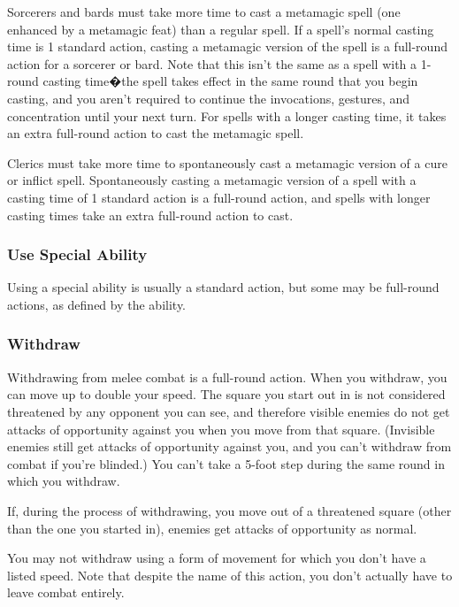 \vspace*{10pt}

Sorcerers and bards must take more time to cast a metamagic spell (one enhanced by a metamagic feat) than a regular spell. If a spell's normal casting time is 1 standard action, casting a metamagic version of the spell is a full-round action for a sorcerer or bard. Note that this isn't the same as a spell with a 1-round casting time�the spell takes effect in the same round that you begin casting, and you aren't required to continue the invocations, gestures, and concentration until your next turn. For spells with a longer casting time, it takes an extra full-round action to cast the metamagic spell.

Clerics must take more time to spontaneously cast a metamagic version of a cure or inflict spell. Spontaneously casting a metamagic version of a spell with a casting time of 1 standard action is a full-round action, and spells with longer casting times take an extra full-round action to cast.

\subsubsection{Use Special Ability}

Using a special ability is usually a standard action, but some may be full-round actions, as defined by the ability.

\subsubsection{Withdraw}

Withdrawing from melee combat is a full-round action. When you withdraw, you can move up to double your speed. The square you start out in is not considered threatened by any opponent you can see, and therefore visible enemies do not get attacks of opportunity against you when you move from that square. (Invisible enemies still get attacks of opportunity against you, and you can't withdraw from combat if you're blinded.) You can't take a 5-foot step during the same round in which you withdraw.

If, during the process of withdrawing, you move out of a threatened square (other than the one you started in), enemies get attacks of opportunity as normal. 

You may not withdraw using a form of movement for which you don't have a listed speed. 
Note that despite the name of this action, you don't actually have to leave combat entirely.

